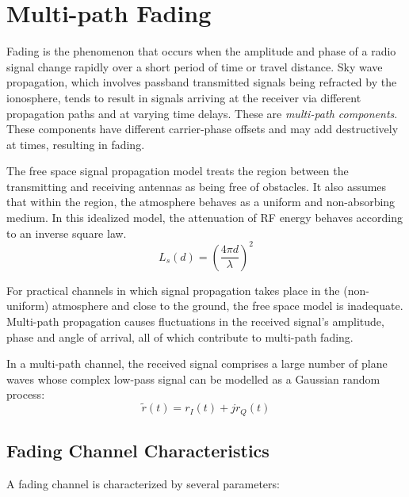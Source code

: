 \section{Multi-path Fading}
Fading is the phenomenon that occurs when the amplitude and phase of a radio signal change rapidly over a short period of time or travel distance\cite{fuqin}.
Sky wave propagation, which involves passband transmitted signals being refracted by the ionosphere, tends to result in signals arriving at the receiver via different propagation paths and at varying time delays. These are \emph{multi-path components}.
These components have different carrier-phase offsets and may add destructively at times, resulting in fading\cite{Proakis}. 

The free space signal propagation model treats the region between the transmitting and receiving antennas as being free of obstacles. It also assumes that within the region, the atmosphere behaves as a uniform and non-absorbing medium. In this idealized model, the attenuation of \gls{RF} energy behaves according to an inverse square law\cite{AWGN}.
\[
	L_s(d) = \left( \frac{4\pi d}{\lambda} \right)^2
\]
\begin{mathDef}
\end{mathDef}
For practical channels in which signal propagation takes place in the (non-uniform) atmosphere and close to the ground, the free space model is inadequate. Multi-path propagation causes fluctuations in the received signal's amplitude, phase and angle of arrival, all of which contribute to multi-path fading\cite{AWGN}.

In a multi-path channel, the received signal comprises a large number of plane waves whose complex low-pass signal can be modelled as a Gaussian random process\cite{fuqin}:
\[
	\tilde{r}(t) = r_I(t) + jr_Q(t)
\]
\begin{mathDef}
\end{mathDef}

\subsection{Fading Channel Characteristics}
A fading channel is characterized by several parameters:
